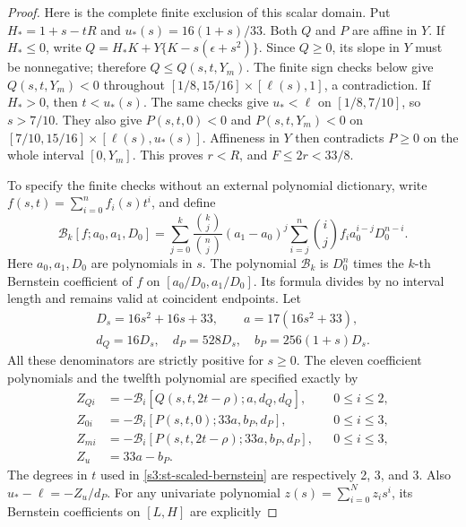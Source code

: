 \documentclass[11pt,reqno]{amsart}
\theoremstyle{definition}
\theoremstyle{remark}
\begin{document}
\begin{proof}
Here is the complete finite exclusion of this scalar domain.
Put \(H_*=1+s-tR\) and \(u_*(s)=16(1+s)/33\).
Both \(Q\) and \(P\) are affine in \(Y\).
If \(H_*\le0\), write
\(Q=H_*K+Y\{K-s(\epsilon+s^2)\}\).
Since \(Q\ge0\), its slope in \(Y\) must be nonnegative;
therefore \(Q\le Q(s,t,Y_m)\). The finite sign checks below
give \(Q(s,t,Y_m)<0\) throughout
\([1/8,15/16]\times[\ell(s),1]\), a contradiction.
If \(H_*>0\), then \(t<u_*(s)\). The same checks give
\(u_*<\ell\) on \([1/8,7/10]\), so \(s>7/10\).
They also give \(P(s,t,0)<0\) and \(P(s,t,Y_m)<0\)
on \([7/10,15/16]\times[\ell(s),u_*(s)]\).
Affineness in \(Y\) then contradicts \(P\ge0\) on the
whole interval \([0,Y_m]\). This proves \(r<R\), and
\(F\le2r<33/8\).

To specify the finite checks without an external polynomial dictionary,
write \(f(s,t)=\sum_{i=0}^n f_i(s)t^i\), and define
\begin{equation}\label{s3:st-scaled-bernstein}
 \mathcal B_k[f;a_0,a_1,D_0]
 =\sum_{j=0}^k\frac{\binom{k}{j}}{\binom{n}{j}}
   (a_1-a_0)^j\sum_{i=j}^n\binom{i}{j}
             f_i a_0^{i-j}D_0^{n-i}.
\end{equation}
Here \(a_0,a_1,D_0\) are polynomials in \(s\).
The polynomial \(\mathcal B_k\) is \(D_0^n\) times the
\(k\)-th Bernstein coefficient of \(f\) on
\([a_0/D_0,a_1/D_0]\). Its formula divides by no interval
length and remains valid at coincident endpoints.
Let
\[
\begin{gathered} D_s=16s^2+16s+33,\qquad a=17(16s^2+33),\\
 d_Q=16D_s,\quad d_P=528D_s,\quad b_P=256(1+s)D_s.\end{gathered}
\]
All these denominators are strictly positive for \(s\ge0\).
The eleven coefficient polynomials and the twelfth polynomial are
specified exactly by
\begin{align*}
 Z_{Qi}&=-\mathcal B_i[Q(s,t,2t-\rho);a,d_Q,d_Q],
                                      &&0\le i\le2,\\
 Z_{0i}&=-\mathcal B_i[P(s,t,0);33a,b_P,d_P],
                                      &&0\le i\le3,\\
 Z_{mi}&=-\mathcal B_i[P(s,t,2t-\rho);33a,b_P,d_P],
                                      &&0\le i\le3,\\
 Z_u&=33a-b_P.
\end{align*}
The degrees in \(t\) used in \eqref{s3:st-scaled-bernstein}
are respectively 2, 3, and 3. Also
\(u_* -\ell=-Z_u/d_P\).
For any univariate polynomial \(z(s)=\sum_{i=0}^N z_i s^i\),
its Bernstein coefficients on \([L,H]\) are explicitly

\end{proof}
\end{document}
